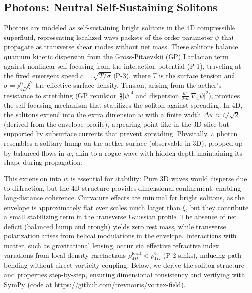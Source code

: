 \subsection{Photons: Neutral Self-Sustaining Solitons}

Photons are modeled as self-sustaining bright solitons in the 4D compressible superfluid, representing localized wave packets of the order parameter $\psi$ that propagate as transverse shear modes without net mass. These solitons balance quantum kinetic dispersion from the Gross-Pitaevskii (GP) Laplacian term against nonlinear self-focusing from the interaction potential (P-1), traveling at the fixed emergent speed $c = \sqrt{T / \sigma}$ (P-3), where $T$ is the surface tension and $\sigma = \rho_{4D}^0 \xi^2$ the effective surface density. Tension, arising from the aether's resistance to stretching (GP repulsion $\frac{g}{2} |\psi|^4$ and dispersion $\frac{\hbar^2}{2m} |\nabla_4 \psi|^2$), provides the self-focusing mechanism that stabilizes the soliton against spreading. In 4D, the solitons extend into the extra dimension $w$ with a finite width $\Delta w \approx \xi / \sqrt{2}$ (derived from the envelope profile), appearing point-like in the 3D slice but supported by subsurface currents that prevent spreading. Physically, a photon resembles a solitary hump on the aether surface (observable in 3D), propped up by balanced flows in $w$, akin to a rogue wave with hidden depth maintaining its shape during propagation.

This extension into $w$ is essential for stability: Pure 3D waves would disperse due to diffraction, but the 4D structure provides dimensional confinement, enabling long-distance coherence. Curvature effects are minimal for bright solitons, as the envelope is approximately flat over scales much larger than $\xi$, but they contribute a small stabilizing term in the transverse Gaussian profile. The absence of net deficit (balanced hump and trough) yields zero rest mass, while transverse polarization arises from helical modulations in the envelope. Interactions with matter, such as gravitational lensing, occur via effective refractive index variations from local density rarefactions $\rho_{4D}^{\text{local}} < \rho_{4D}^0$ (P-2 sinks), inducing path bending without direct vorticity coupling. Below, we derive the soliton structure and properties step-by-step, ensuring dimensional consistency and verifying with SymPy (code at \url{https://github.com/trevnorris/vortex-field}).

